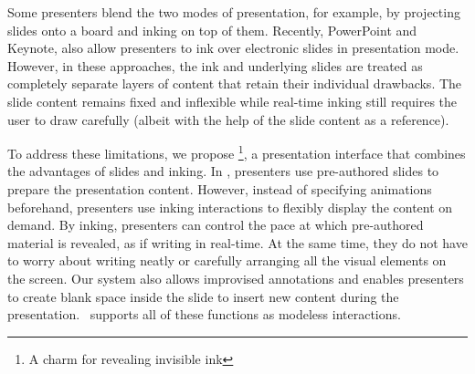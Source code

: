 Some presenters blend the two modes of presentation, for example, by projecting slides onto a board and inking on top of them. Recently, PowerPoint and Keynote, also allow presenters to ink over electronic slides in presentation mode. However, in these approaches, the ink and underlying slides are treated as completely separate layers of content that retain their individual drawbacks. 
%
The slide content remains fixed and inflexible while real-time inking still requires the user to draw carefully (albeit with the help of the slide content as a reference).

To address these limitations, we propose \interface \footnote{A charm for revealing invisible ink\cite{rowling1997harry}}, a presentation interface that combines the advantages of slides and inking.
%
In \interface, presenters use pre-authored slides to prepare the presentation content. However, instead of specifying animations beforehand, presenters use inking interactions to flexibly display the content on demand. By inking, presenters can control the pace at which pre-authored material is revealed, as if writing in real-time. At the same time, they do not have to worry about writing neatly or carefully arranging all the visual elements on the screen. Our system also allows improvised annotations and enables presenters to create blank space inside the slide to insert new content during the presentation. \interface\ supports all of these functions as modeless interactions.

